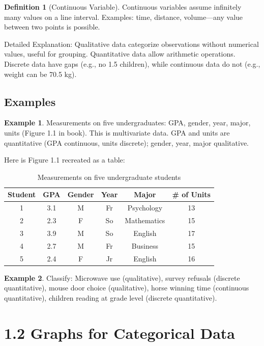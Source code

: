 \documentclass{article}
\theoremstyle{definition}
\newtheorem{definition}{Definition}
\newtheorem{example}{Example}
\begin{document}
	\begin{definition}[Continuous Variable]
		Continuous variables assume infinitely many values on a line interval. Examples: time, distance, volume—any value between two points is possible.
	\end{definition}
	
	Detailed Explanation: Qualitative data categorize observations without numerical values, useful for grouping. Quantitative data allow arithmetic operations. Discrete data have gaps (e.g., no 1.5 children), while continuous data do not (e.g., weight can be 70.5 kg).
	
	\subsection{Examples}
	
	\begin{example}
		Measurements on five undergraduates: GPA, gender, year, major, units (Figure 1.1 in book). This is multivariate data. GPA and units are quantitative (GPA continuous, units discrete); gender, year, major qualitative.
		
		Here is Figure 1.1 recreated as a table:
		
		\begin{table}[ht]
			\centering
			\begin{tabular}{cccccc}
				\toprule
				Student & GPA & Gender & Year & Major & \# of Units \\
				\midrule
				1 & 3.1 & M & Fr & Psychology & 13 \\
				2 & 2.3 & F & So & Mathematics & 15 \\
				3 & 3.9 & M & So & English & 17 \\
				4 & 2.7 & M & Fr & Business & 15 \\
				5 & 2.4 & F & Jr & English & 16 \\
				\bottomrule
			\end{tabular}
			\caption{Measurements on five undergraduate students}
		\end{table}
	\end{example}
	
	\begin{example}
		Classify: Microwave use (qualitative), survey refusals (discrete quantitative), mouse door choice (qualitative), horse winning time (continuous quantitative), children reading at grade level (discrete quantitative).
	\end{example}
	\newpage
	\section{1.2 Graphs for Categorical Data}
	
\end{document}
